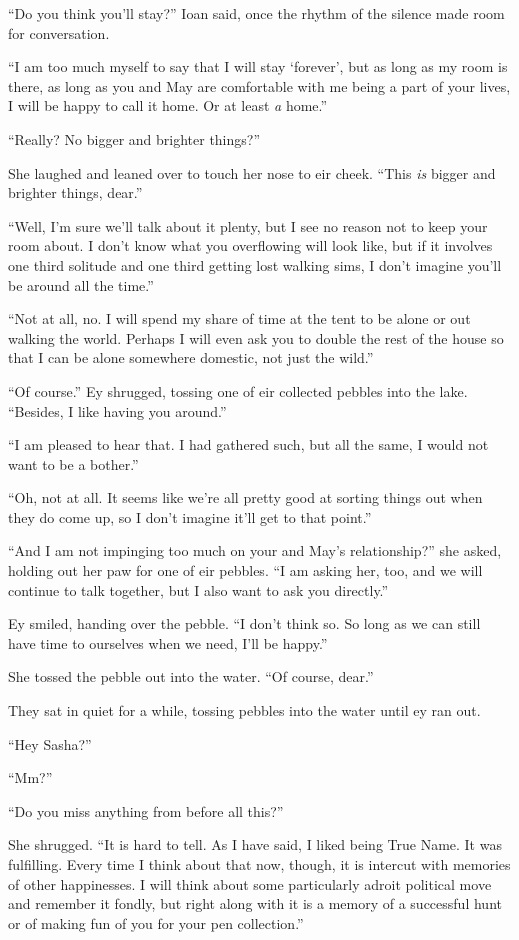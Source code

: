 ``Do you think you'll stay?'' Ioan said, once the rhythm of the silence made room for conversation.

``I am too much myself to say that I will stay `forever', but as long as my room is there, as long as you and May are comfortable with me being a part of your lives, I will be happy to call it home. Or at least \emph{a} home.''

``Really? No bigger and brighter things?''

She laughed and leaned over to touch her nose to eir cheek. ``This \emph{is} bigger and brighter things, dear.''

``Well, I'm sure we'll talk about it plenty, but I see no reason not to keep your room about. I don't know what you overflowing will look like, but if it involves one third solitude and one third getting lost walking sims, I don't imagine you'll be around all the time.''

``Not at all, no. I will spend my share of time at the tent to be alone or out walking the world. Perhaps I will even ask you to double the rest of the house so that I can be alone somewhere domestic, not just the wild.''

``Of course.'' Ey shrugged, tossing one of eir collected pebbles into the lake. ``Besides, I like having you around.''

``I am pleased to hear that. I had gathered such, but all the same, I would not want to be a bother.''

``Oh, not at all. It seems like we're all pretty good at sorting things out when they do come up, so I don't imagine it'll get to that point.''

``And I am not impinging too much on your and May's relationship?'' she asked, holding out her paw for one of eir pebbles. ``I am asking her, too, and we will continue to talk together, but I also want to ask you directly.''

Ey smiled, handing over the pebble. ``I don't think so. So long as we can still have time to ourselves when we need, I'll be happy.''

She tossed the pebble out into the water. ``Of course, dear.''

They sat in quiet for a while, tossing pebbles into the water until ey ran out.

``Hey Sasha?''

``Mm?''

``Do you miss anything from before all this?''

She shrugged. ``It is hard to tell. As I have said, I liked being True Name. It was fulfilling. Every time I think about that now, though, it is intercut with memories of other happinesses. I will think about some particularly adroit political move and remember it fondly, but right along with it is a memory of a successful hunt or of making fun of you for your pen collection.''

